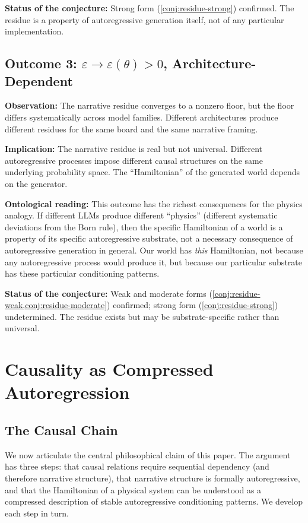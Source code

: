 \documentclass[12pt,a4paper]{article}
\theoremstyle{definition}
\theoremstyle{remark}
\begin{document}
\textbf{Status of the conjecture:} Strong form
(\cref{conj:residue-strong}) confirmed.  The residue is a property
of autoregressive generation itself, not of any particular
implementation.

\subsection{Outcome 3: $\varepsilon \to \varepsilon(\theta) > 0$,
Architecture-Dependent}

\textbf{Observation:} The narrative residue converges to a nonzero
floor, but the floor differs systematically across model families.
Different architectures produce different residues for the same
board and the same narrative framing.

\textbf{Implication:} The narrative residue is real but not universal.
Different autoregressive processes impose different causal structures
on the same underlying probability space.  The ``Hamiltonian'' of the
generated world depends on the generator.

\textbf{Ontological reading:} This outcome has the richest
consequences for the physics analogy.  If different LLMs produce different
``physics'' (different systematic deviations from the Born rule),
then the specific Hamiltonian of a world is a property of its
specific autoregressive substrate, not a necessary consequence of
autoregressive generation in general.  Our world has \emph{this}
Hamiltonian, not because any autoregressive process would produce it,
but because our particular substrate has these particular
conditioning patterns.

\textbf{Status of the conjecture:} Weak and moderate forms
(\cref{conj:residue-weak,conj:residue-moderate}) confirmed; strong
form (\cref{conj:residue-strong}) undetermined.  The residue exists
but may be substrate-specific rather than universal.


\section{Causality as Compressed Autoregression}
\label{sec:causality}

\subsection{The Causal Chain}

We now articulate the central philosophical claim of this paper.
The argument has three steps: that causal relations require
sequential dependency (and therefore narrative structure), that
narrative structure is formally autoregressive, and that the
Hamiltonian of a physical system can be understood as a compressed
description of stable autoregressive conditioning patterns.
We develop each step in turn.
\end{document}
